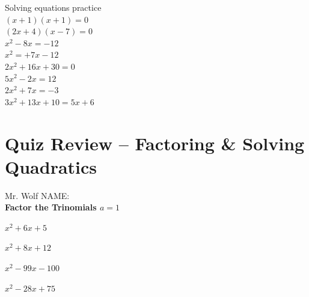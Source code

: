 \documentclass[11pt]{article}
\begin{document}
Solving equations practice\\

$(x+1)(x+1)=0$\\
		
		
		
$(2x+4)(x-7)=0$\\


$x^2-8x=-12$\\
		
		
$x^2=+7x-12$\\


$2x^2+16x+30=0$\\


 $5x^2-2x=12$\\
 
 $2x^2+7x=-3$\\
 
 $3x^2+13x+10=5x+6$

\pagebreak

\section*{Quiz Review -- Factoring \& Solving Quadratics}


Mr. Wolf \hfill NAME:\underline{\hspace{3in}}\\ 



\textbf{Factor the Trinomials $a=1$}\\

\begin{enumerate}
\begin{multicols}{2}

\item $x^2+6x+5$\\

	\vspace{1cm}

\item $x^2+8x+12$\\

	\vspace{1cm}

\item $x^2-99x-100$\\

	\vspace{1cm}

\item $x^2-28x+75$\\

	\vspace{1cm}

\end{multicols}
\end{enumerate}
\end{document}
